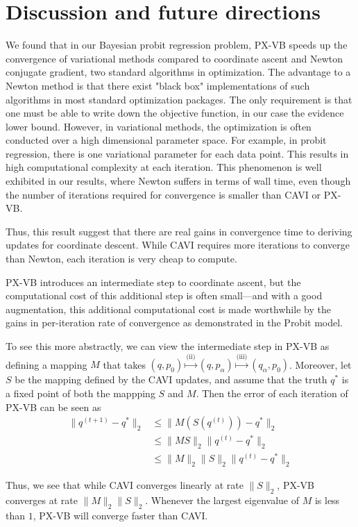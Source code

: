 \documentclass{article}
\begin{document}
\section{Discussion and future directions}
We found that in our Bayesian probit regression problem, PX-VB speeds up the convergence of variational methods compared to coordinate ascent and Newton conjugate gradient, two standard algorithms in optimization. The advantage to a Newton method is that there exist "black box" implementations of such algorithms in most standard optimization packages. The only requirement is that one must be able to write down the objective function, in our case the evidence lower bound. However, in variational methods, the optimization is often conducted over a high dimensional parameter space. For example, in probit regression, there is one variational parameter for each data point. This results in high computational complexity at each iteration. This phenomenon is well exhibited in our results, where Newton suffers in terms of wall time, even though the number of iterations required for convergence is smaller than CAVI or PX-VB. 

Thus, this result suggest that there are real gains in convergence time to deriving updates for coordinate descent. While CAVI requires more iterations to converge than Newton, each iteration is very cheap to compute. 

PX-VB introduces an intermediate step to coordinate ascent, but the computational cost of this additional step is often small---and with a good augmentation, this additional computational cost is made worthwhile by the gains in per-iteration rate of convergence as demonstrated in the Probit model.

To see this more abstractly, we can view the intermediate step in PX-VB as defining a mapping $M$ that takes $(q, p_0) \stackrel{\text{(ii)}}{\mapsto} (q, p_\alpha) \stackrel{\text{(iii)}}{\mapsto} (q_\alpha, p_0)$. Moreover, let $S$ be the mapping defined by the CAVI updates, and assume that the truth $q^*$ is a fixed point of both the mappping $S$ and $M$. Then the error of each iteration of PX-VB can be seen as
\begin{align}
\|q^{(t+1)} - q^*\|_2 &\leq \| M(S(q^{(t)})) - q^*\|_2 \\
&\leq \|MS\|_2 \|q^{(t)} - q^*\|_2\\
&\leq \|M\|_2\|S\|_2 \|q^{(t)} - q^*\|_2
\end{align}

Thus, we see that while CAVI converges linearly at rate $\|S\|_2$, PX-VB converges at rate $\|M\|_2\|S\|_2$. Whenever the largest eigenvalue of $M$ is less than $1$, PX-VB will converge faster than CAVI. 
\end{document}
